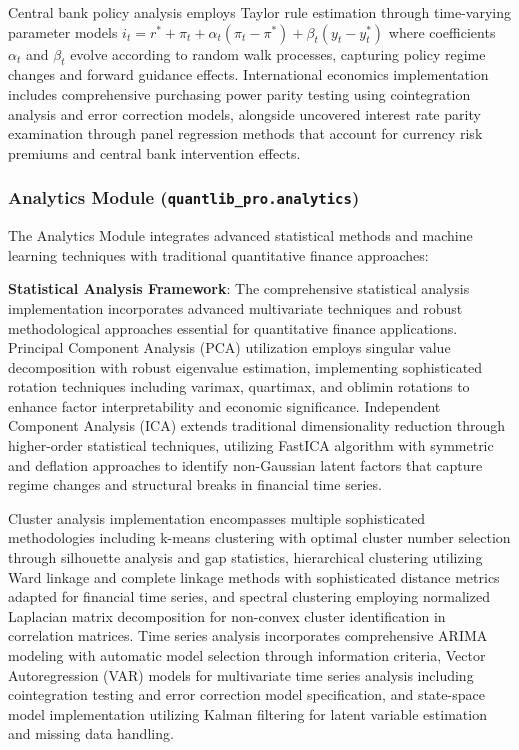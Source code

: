 \documentclass[12pt,a4paper]{article}
\theoremstyle{definition}
\theoremstyle{remark}
\begin{document}
Central bank policy analysis employs Taylor rule estimation through time-varying parameter models $i_t = r^* + \pi_t + \alpha_t(\pi_t - \pi^*) + \beta_t(y_t - y_t^*)$ where coefficients $\alpha_t$ and $\beta_t$ evolve according to random walk processes, capturing policy regime changes and forward guidance effects. International economics implementation includes comprehensive purchasing power parity testing using cointegration analysis and error correction models, alongside uncovered interest rate parity examination through panel regression methods that account for currency risk premiums and central bank intervention effects.

\subsubsection{Analytics Module (\texttt{quantlib\_pro.analytics})}

The Analytics Module integrates advanced statistical methods and machine learning techniques with traditional quantitative finance approaches:

\textbf{Statistical Analysis Framework}: The comprehensive statistical analysis implementation incorporates advanced multivariate techniques and robust methodological approaches essential for quantitative finance applications. Principal Component Analysis (PCA) utilization employs singular value decomposition with robust eigenvalue estimation, implementing sophisticated rotation techniques including varimax, quartimax, and oblimin rotations to enhance factor interpretability and economic significance. Independent Component Analysis (ICA) extends traditional dimensionality reduction through higher-order statistical techniques, utilizing FastICA algorithm with symmetric and deflation approaches to identify non-Gaussian latent factors that capture regime changes and structural breaks in financial time series.

Cluster analysis implementation encompasses multiple sophisticated methodologies including k-means clustering with optimal cluster number selection through silhouette analysis and gap statistics, hierarchical clustering utilizing Ward linkage and complete linkage methods with sophisticated distance metrics adapted for financial time series, and spectral clustering employing normalized Laplacian matrix decomposition for non-convex cluster identification in correlation matrices. Time series analysis incorporates comprehensive ARIMA modeling with automatic model selection through information criteria, Vector Autoregression (VAR) models for multivariate time series analysis including cointegration testing and error correction model specification, and state-space model implementation utilizing Kalman filtering for latent variable estimation and missing data handling.
\end{document}
